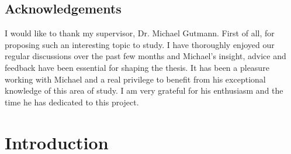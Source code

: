 \documentclass[msc,deptreport.inf]{infthesis} %
\begin{document}
\begin{preliminary}
\maketitle

\section*{Acknowledgements}
I would like to thank my supervisor, Dr. Michael Gutmann. First of all, for proposing such an interesting topic to study. I have thoroughly enjoyed our regular discussions over the past few months and Michael's insight, advice and feedback have been essential for shaping the thesis. It has been a pleasure working with Michael and a real privilege to benefit from his exceptional knowledge of this area of study. I am very grateful for his enthusiasm and the time he has dedicated to this project. 

\tableofcontents
\end{preliminary}


\chapter{Introduction}
\end{document}
